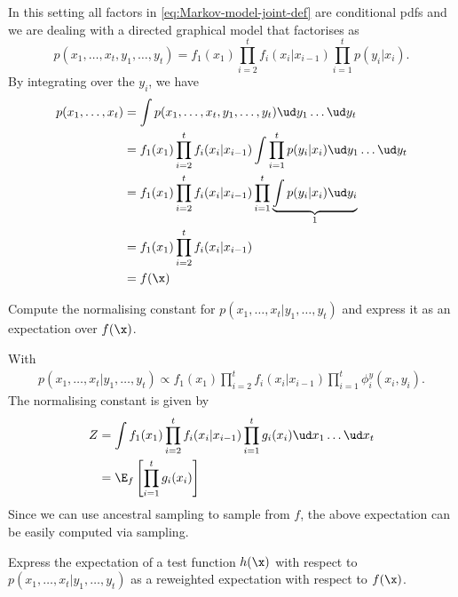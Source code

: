 \begin{exenumerate}
  \begin{solution}
    In this setting all factors in \eqref{eq:Markov-model-joint-def}
    are conditional pdfs and we are dealing with a directed graphical
    model that factorises as
    \begin{equation}
      p(x_1, \ldots, x_t, y_1, \ldots, y_t) = f_1(x_1) \prod_{i=2}^t f_i(x_i|x_{i-1}) \prod_{i=1}^t p(y_i|x_i).
    \end{equation}
    By integrating over the $y_i$, we have
    \begin{align}
      p(x_1, \ldots, x_t) &= \int p(x_1, \ldots, x_t, y_1, \ldots, y_t) \ud y_1 \ldots \ud y_t\\
      & = f_1(x_1) \prod_{i=2}^t f_i(x_i|x_{i-1}) \int \prod_{i=1}^t p(y_i|x_i) \ud y_1 \ldots \ud y_t\\
      & = f_1(x_1) \prod_{i=2}^t f_i(x_i|x_{i-1}) \prod_{i=1}^t \underbrace{\int  p(y_i|x_i) \ud y_i}_{1}\\
      & = f_1(x_1) \prod_{i=2}^t f_i(x_i|x_{i-1})\\
      & = f(\x)
    \end{align}

  \end{solution}


\item Compute the normalising constant for $p(x_1, \ldots, x_t | y_1, \ldots, y_t)$ and express it as an expectation over $f(\x)$.
  \begin{solution}
    With
    \begin{align}
      p(x_1, \ldots, x_t | y_1, \ldots, y_t) \propto f_1(x_1) \prod_{i=2}^t f_i(x_i|x_{i-1}) \prod_{i=1}^t \phi_i^y(x_i, y_i).
    \end{align}
    The normalising constant is given by
    \begin{align}
      Z & = \int f_1(x_1) \prod_{i=2}^t f_i(x_i|x_{i-1})\prod_{i=1}^t g_i(x_i) \ud x_1 \ldots \ud x_t\\
      & = \E_f\left [\prod_{i=1}^t g_i(x_i) \right]
    \end{align}
    Since we can use ancestral sampling to sample from $f$, the
    above expectation can be easily computed via sampling.

  \end{solution}

\item Express the expectation of a test function $h(\x)$ with respect
  to $p(x_1, \ldots, x_t | y_1, \ldots, y_t)$ as a reweighted
  expectation with respect to $f(\x)$.


\end{exenumerate}

